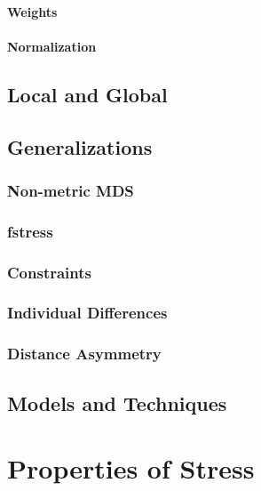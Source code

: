 \documentclass[
  12pt,
]{book}
\begin{document}
\subsubsection{Weights}\label{bweights}

\subsubsection{Normalization}\label{intronorm}

\section{Local and Global}\label{seclocglob}

\section{Generalizations}\label{introgeneralize}

\subsection{Non-metric MDS}\label{gennonmetric}

\subsection{fstress}\label{genfstress}

\subsection{Constraints}\label{gencons}

\subsection{Individual Differences}\label{inreplic}

\subsection{Distance Asymmetry}\label{genasym}

\section{Models and Techniques}\label{models-and-techniques}

\chapter{Properties of Stress}\label{propchapter}
\end{document}
